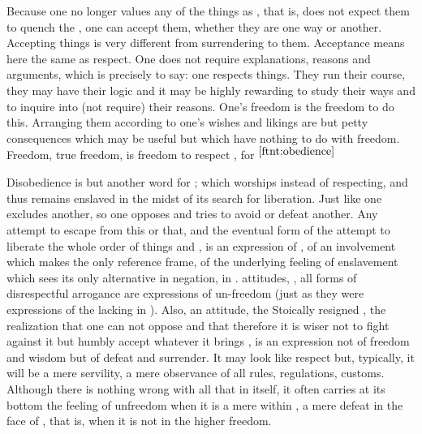 Because one no longer values any of the  things as ,
that is, does not expect them to quench the , one can accept
them, whether they are one way or another.  
%
Accepting things is very different from surrendering to them. Acceptance means
here the same as respect. One does not require explanations, reasons and
arguments, which is precisely to say: one respects things.  They run their
course, they may have their logic and it may be highly rewarding to study their
ways and to inquire into (not require) their reasons. One's freedom is the freedom
to do this.  Arranging them according to one's wishes and likings are but
petty consequences which may be useful but which have nothing to do with 
freedom.  Freedom, true freedom, is freedom to respect , for $^{\ref{ftnt:obedience}}$

Disobedience is but another word for ;  which
worships instead of respecting, and thus remains enslaved in the midst of its
search for liberation. Just like one  excludes another, so one
 opposes and tries to avoid or defeat another.  Any attempt to escape
from this or that, and the eventual form of the attempt to liberate 
 the whole order of things and , is an expression of
, of an involvement which makes  the only
reference frame, of the underlying feeling of enslavement which sees its only
alternative in negation, in .  attitudes,
, all forms
of disrespectful arrogance are expressions of un-freedom (just as they were
expressions of the lacking  in ).  Also, an
 attitude, the Stoically resigned , the
realization that one can not oppose  and that therefore
it is wiser not to fight against it but humbly accept whatever it brings
, is an expression not of freedom and wisdom but of defeat and surrender.
It may look like respect but, typically, it will be a mere servility, a mere
observance of all rules, regulations, customs.  Although there is nothing wrong
with all that in itself, it often carries at its bottom the feeling of unfreedom
when it is a mere  within , a mere defeat in the face of
, that is, when it is not  in the higher
freedom.


